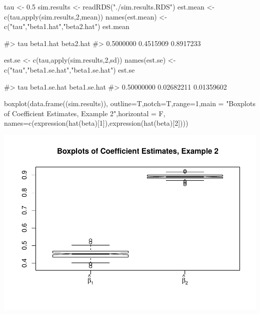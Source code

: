 \begin{Schunk}
\begin{Sinput}
tau <- 0.5
sim.results <- readRDS("./sim.results.RDS")
est.mean <- c(tau,apply(sim.results,2,mean))
names(est.mean) <- c("tau","beta1.hat","beta2.hat")
est.mean
\end{Sinput}
\begin{Soutput}
#>       tau beta1.hat beta2.hat 
#> 0.5000000 0.4515909 0.8917233
\end{Soutput}
\end{Schunk}

\begin{Schunk}
\begin{Sinput}
est.se <- c(tau,apply(sim.results,2,sd))
names(est.se) <- c("tau","beta1.se.hat","beta1.se.hat")
est.se
\end{Sinput}
\begin{Soutput}
#>          tau beta1.se.hat beta1.se.hat 
#>   0.50000000   0.02682211   0.01359602
\end{Soutput}
\end{Schunk}

\begin{Schunk}
\begin{Sinput}
boxplot(data.frame((sim.results)), outline=T,notch=T,range=1,main = "Boxplots of Coefficient Estimates, Example 2",horizontal = F,
names=c(expression(hat(beta)[1]),expression(hat(beta)[2])))
\end{Sinput}

\includegraphics{siqr_files/figure-latex/unnamed-chunk-14-1} \end{Schunk}

